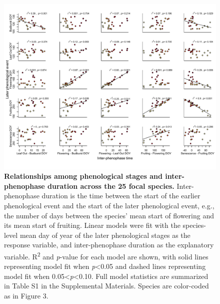 \documentclass{article}
\begin{document}
\begin{figure}[h]
  \centering
  \includegraphics{../analyses/figures/adj_stagesmegaplot_col_YOR_ripefruit.pdf}
  \caption{\textbf{Relationships among phenological stages and inter-phenophase duration across the 25 focal species.} Inter-phenophase duration is the time between the start of the earlier phenological event and the start of the later phenological event, e.g., the number of days between the species' mean start of flowering and its mean start of fruiting. Linear models were fit with the species-level mean day of year of the later phenological stages as the response variable, and inter-phenophase duration as the explanatory variable. R\textsuperscript{2} and \textit{p}-value for each model are shown, with solid lines representing model fit when \textit{p}<0.05 and dashed lines representing model fit when 0.05<\textit{p}<0.10. Full model statistics are summarized in Table S1 in the Supplemental Materials. Species are color-coded as in Figure 3.}
  \label{fig:inter}
   \end{figure}


\end{document}
